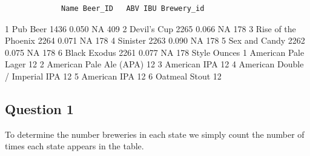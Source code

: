 \documentclass[]{article}
\newenvironment{Shaded}{\begin{snugshade}}{\end{snugshade}}
\newcommand{\KeywordTok}[1]{\textcolor[rgb]{0.13,0.29,0.53}{\textbf{#1}}}
\newcommand{\StringTok}[1]{\textcolor[rgb]{0.31,0.60,0.02}{#1}}
\newcommand{\CommentTok}[1]{\textcolor[rgb]{0.56,0.35,0.01}{\textit{#1}}}
\newcommand{\OperatorTok}[1]{\textcolor[rgb]{0.81,0.36,0.00}{\textbf{#1}}}
\newcommand{\NormalTok}[1]{#1}
\begin{document}
\begin{verbatim}
             Name Beer_ID   ABV IBU Brewery_id
\end{verbatim}

1 Pub Beer 1436 0.050 NA 409 2 Devil's Cup 2265 0.066 NA 178 3 Rise of
the Phoenix 2264 0.071 NA 178 4 Sinister 2263 0.090 NA 178 5 Sex and
Candy 2262 0.075 NA 178 6 Black Exodus 2261 0.077 NA 178 Style Ounces 1
American Pale Lager 12 2 American Pale Ale (APA) 12 3 American IPA 12 4
American Double / Imperial IPA 12 5 American IPA 12 6 Oatmeal Stout 12

\begin{Shaded}
\end{Shaded}

\subsection{Question 1}\label{question-1}

To determine the number breweries in each state we simply count the
number of times each state appears in the table.
\end{document}
